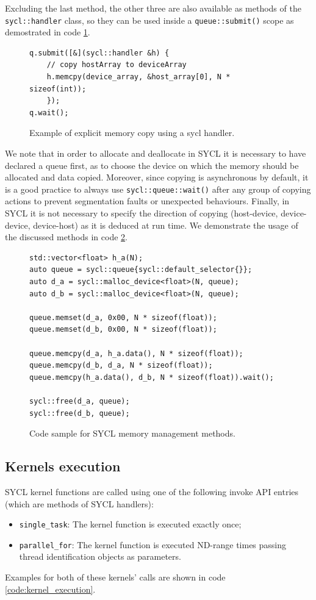 Excluding the last method, the other three are also available as methods of the \Verb "sycl::handler" class, so they can be used inside a \Verb "queue::submit()" scope as demostrated in code \ref{code:handler_copy}.


\begin{figure}[ht!]
\renewcommand{\figurename}{Code}
\begin{verbatim}
q.submit([&](sycl::handler &h) {
    // copy hostArray to deviceArray
    h.memcpy(device_array, &host_array[0], N * sizeof(int));
    });
q.wait();
\end{verbatim}
\caption{Example of explicit memory copy using a sycl handler.}
\label{code:handler_copy}
\end{figure}

We note that in order to allocate and deallocate in SYCL it is necessary to have declared a queue first, as to choose the device on which the memory should be allocated and data copied. Moreover, since copying is asynchronous by default, it is a good practice to always use \Verb "sycl::queue::wait()" after any group of copying actions to prevent segmentation faults or unexpected behaviours. Finally, in SYCL it is not necessary to specify the direction of copying (host-device, device-device, device-host) as it is deduced at run time. We demonstrate the usage of the discussed methods in code \ref{code:sycl_memory}.

\begin{figure}[ht!]
\renewcommand{\figurename}{Code}
\begin{verbatim}
std::vector<float> h_a(N);
auto queue = sycl::queue{sycl::default_selector{}};
auto d_a = sycl::malloc_device<float>(N, queue);
auto d_b = sycl::malloc_device<float>(N, queue);

queue.memset(d_a, 0x00, N * sizeof(float));
queue.memset(d_b, 0x00, N * sizeof(float));

queue.memcpy(d_a, h_a.data(), N * sizeof(float));
queue.memcpy(d_b, d_a, N * sizeof(float));
queue.memcpy(h_a.data(), d_b, N * sizeof(float)).wait();

sycl::free(d_a, queue);
sycl::free(d_b, queue);
\end{verbatim}
\caption{Code sample for SYCL memory management methods.}
\label{code:sycl_memory}
\end{figure}

\subsection{Kernels execution}
\label{ch:kernels_execution}
SYCL kernel functions are called using one of the following invoke API entries (which are methods of SYCL handlers):
\begin{itemize}
    \item \Verb "single_task": The kernel function is executed exactly once;
    \item \Verb "parallel_for": The kernel function is executed ND-range times passing thread identification objects as parameters.
\end{itemize}
Examples for both of these kernels' calls are shown in code \ref{code:kernel_execution}.

